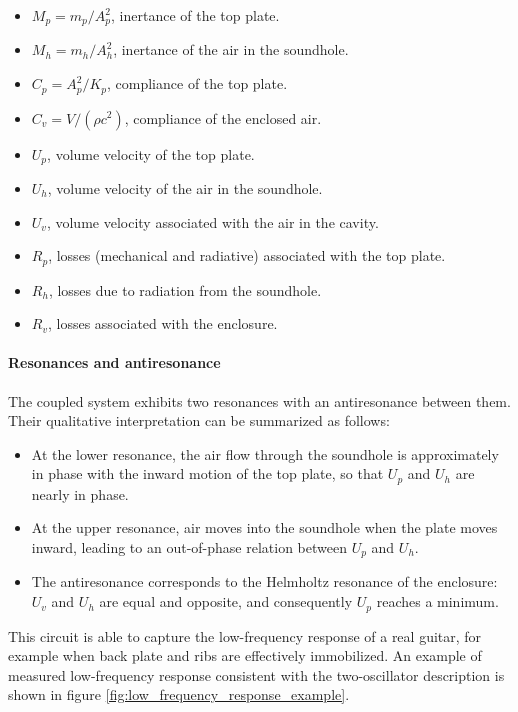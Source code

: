 \begin{itemize}
    \item \( M_p = m_p/A_p^{2} \), inertance of the top plate.
    \item \( M_h = m_h/A_h^{2} \), inertance of the air in the soundhole.
    \item \( C_p = A_p^{2}/K_p \), compliance of the top plate.
    \item \( C_v = V/(\rho c^{2}) \), compliance of the enclosed air.
    \item \( U_p \), volume velocity of the top plate.
    \item \( U_h \), volume velocity of the air in the soundhole.
    \item \( U_v \), volume velocity associated with the air in the cavity.
    \item \( R_p \), losses (mechanical and radiative) associated with the top plate.
    \item \( R_h \), losses due to radiation from the soundhole.
    \item \( R_v \), losses associated with the enclosure.
\end{itemize}

\paragraph{Resonances and antiresonance} The coupled system exhibits two resonances with an antiresonance between them. Their qualitative interpretation can be summarized as follows:

\begin{itemize}
    \item At the lower resonance, the air flow through the soundhole is approximately in phase with the inward motion of the top plate, so that \( U_p \) and \( U_h \) are nearly in phase.
    \item At the upper resonance, air moves into the soundhole when the plate moves inward, leading to an out-of-phase relation between \( U_p \) and \( U_h \).
    \item The antiresonance corresponds to the Helmholtz resonance of the enclosure: \( U_v \) and \( U_h \) are equal and opposite, and consequently \( U_p \) reaches a minimum.
\end{itemize}

This circuit is able to capture the low-frequency response of a real guitar, for example when back plate and ribs are effectively immobilized. An example of measured low-frequency response consistent with the two-oscillator description is shown in figure \ref{fig:low_frequency_response_example}.

